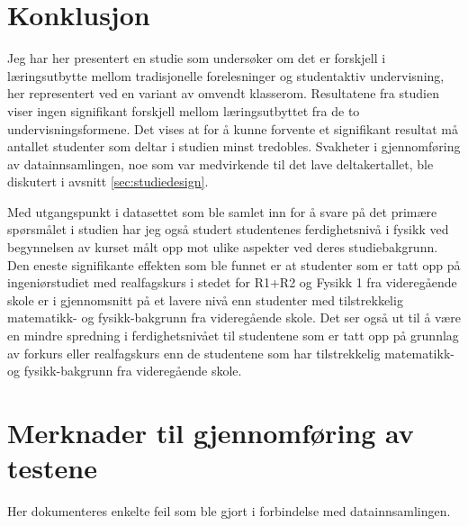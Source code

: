 \documentclass[a4paper,norsk,12pt]{article}
\begin{document}
\section{Konklusjon}
Jeg har her presentert en studie som undersøker om det er forskjell i læringsutbytte mellom tradisjonelle forelesninger og studentaktiv undervisning, her representert ved en variant av omvendt klasserom. Resultatene fra studien viser ingen signifikant forskjell mellom læringsutbyttet fra de to undervisningsformene. Det vises at for å kunne forvente et signifikant resultat må antallet studenter som deltar i studien minst tredobles. Svakheter i gjennomføring av datainnsamlingen, noe som var medvirkende til det lave deltakertallet, ble diskutert i avsnitt \ref{sec:studiedesign}. 

Med utgangspunkt i datasettet som ble samlet inn for å svare på det primære spørsmålet i studien har jeg også studert studentenes ferdighetsnivå i fysikk ved begynnelsen av kurset målt opp mot ulike aspekter ved deres studiebakgrunn. Den eneste signifikante effekten som ble funnet er at studenter som er tatt opp på ingeniørstudiet med realfagskurs i stedet for R1+R2 og Fysikk 1 fra videregående skole er i gjennomsnitt på et lavere nivå enn studenter med tilstrekkelig matematikk- og fysikk-bakgrunn fra videregående skole. Det ser også ut til å være en mindre spredning i ferdighetsnivået til studentene som er tatt opp på grunnlag av forkurs eller realfagskurs enn de studentene som har tilstrekkelig matematikk- og fysikk-bakgrunn fra videregående skole.

\appendix
\section{Merknader til gjennomføring av testene}
Her dokumenteres enkelte feil som ble gjort i forbindelse med datainnsamlingen. 
\end{document}
